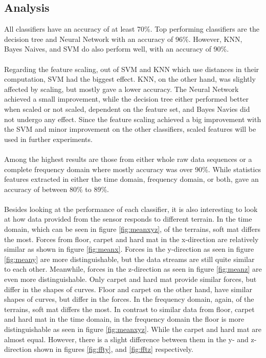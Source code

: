 \documentclass[USenglish]{ifimaster}  %
\begin{document}
\subsection{Analysis}
All classifiers have an accuracy of at least 70\%. Top performing classifiers are the decision tree and Neural Network with an accuracy of 96\%. However, KNN, Bayes Naives, and SVM do also perform well, with an accuracy of 90\%. 
\\
\\
Regarding the feature scaling, out of SVM and KNN which use distances in their computation, SVM had the biggest effect. KNN, on the other hand, was slightly affected by scaling, but mostly gave a lower accuracy. The Neural Network achieved a small improvement, while the decision tree either performed better when scaled or not scaled, dependent on the feature set, and Bayes Navies did not undergo any effect. Since the feature scaling achieved a big improvement with the SVM and minor improvement on the other classifiers, scaled features will be used in further experiments.
\\
\\
Among the highest results are those from either whole raw data sequences or a complete frequency domain where mostly accuracy was over 90\%. While statistics features extracted in either the time domain, frequency domain, or both, gave an accuracy of between 80\% to 89\%.
\\
\\
Besides looking at the performance of each classifier, it is also interesting to look at how data provided from the sensor responds to different terrain. In the time domain, which can be seen in figure \ref{fig:meanxyz}, of the terrains, soft mat differs the most. Forces from floor, carpet and hard mat in the x-direction are relatively similar as shown in figure \ref{fig:meanx}. Forces in the y-direction as seen in figure \ref{fig:meany} are more distinguishable, but the data streams are still quite similar to each other. Meanwhile, forces in the z-direction as seen in figure \ref{fig:meanz} are even more distinguishable. Only carpet and hard mat provide similar forces, but differ in the shapes of curves. Floor and carpet on the other hand, have similar shapes of curves, but differ in the forces. In the frequency domain, again, of the terrains, soft mat differs the most. In contrast to similar data from floor, carpet and hard mat in the time domain, in the frequency domain the floor is more distinguishable as seen in figure \ref{fig:meanxyz}. While the carpet and hard mat are almost equal. However, there is a slight difference between them in the y- and z-direction shown in figures \ref{fig:ffty}, and \ref{fig:fftz} respectively.
\end{document}
